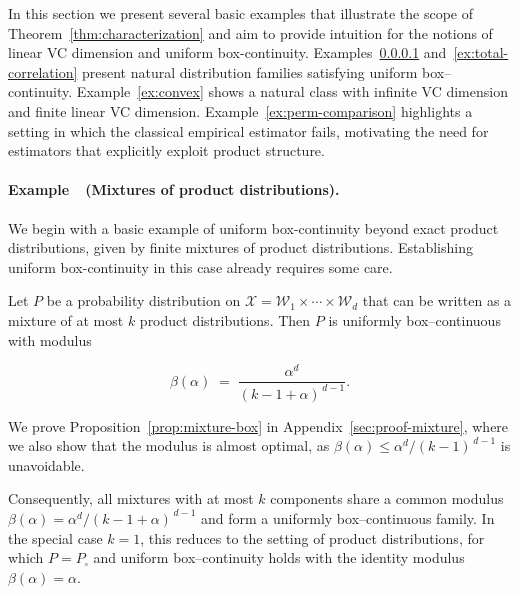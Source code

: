 \documentclass[arxiv]{colt2026}
\newcounter{examplectr}
\newcommand{\X}{\mathcal{X}}
\newcommand{\W}{\mathcal{W}}
\begin{document}
In this section we present several basic examples that illustrate the scope of
Theorem~\ref{thm:characterization} and aim to provide intuition for the notions of
linear VC dimension and uniform box-continuity.
Examples~\ref{ex:mixtures} and~\ref{ex:total-correlation} present natural
distribution families satisfying uniform box--continuity.
Example~\ref{ex:convex} shows a natural class with infinite VC dimension
and finite linear VC dimension.
Example~\ref{ex:perm-comparison} highlights a setting in which the classical
empirical estimator fails, motivating the need for estimators that explicitly
exploit product structure.

\paragraph{Example~\theexamplectr\ (Mixtures of product distributions).}
\label{ex:mixtures}
We begin with a basic example of uniform box-continuity beyond exact product distributions, given by finite mixtures of product distributions.
Establishing uniform box-continuity in this case already requires some care.

\vspace{-0.5em}
\begin{proposition}
\label{prop:mixture-box}
Let $P$ be a probability distribution on $\X=\W_1\times\cdots\times\W_d$ that can
be written as a mixture of at most $k$ product distributions.
Then $P$ is uniformly box--continuous with modulus

\vspace{-0.5em}
\[
\beta(\alpha)
\;=\;
\frac{\alpha^d}{(k-1+\alpha)^{\,d-1}}.
\]
\end{proposition}

\vspace{-0.3em}
{We prove Proposition~\ref{prop:mixture-box} in Appendix~\ref{sec:proof-mixture}, where we also show that the modulus is almost optimal, as $\beta(\alpha)\le \alpha^d/(k-1)^{\,d-1}$ is unavoidable.}

Consequently, all mixtures with at most $k$ components share a common modulus
$\beta(\alpha)=\alpha^d/(k-1 +\alpha)^{\,d-1}$ and form a uniformly box--continuous family. In the special case $k=1$, this reduces to the setting of product distributions,
for which $P=P_{\square}$ and uniform box--continuity holds with the identity
modulus $\beta(\alpha)=\alpha$.

\end{document}
